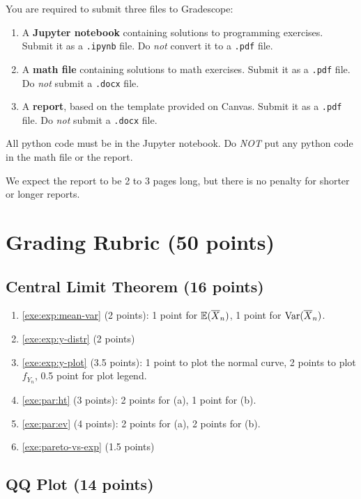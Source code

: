 \documentclass[12pt]{article}
\newcommand*{\Xbar}{\overline{X}}
\begin{document}
You are required to submit three files to Gradescope:
\begin{enumerate}
\item A \textbf{Jupyter notebook} containing solutions to programming exercises.
    Submit it as a \texttt{.ipynb} file. Do \emph{not} convert it to a \texttt{.pdf} file.
\item A \textbf{math file} containing solutions to math exercises.
    Submit it as a \texttt{.pdf} file. Do \emph{not} submit a \texttt{.docx} file.
\item A \textbf{report}, based on the template provided on Canvas.
    Submit it as a \texttt{.pdf} file. Do \emph{not} submit a \texttt{.docx} file.
\end{enumerate}

All python code must be in the Jupyter notebook.
Do \emph{NOT} put any python code in the math file or the report.

We expect the report to be 2 to 3 pages long,
but there is no penalty for shorter or longer reports.

\section{Grading Rubric (50 points)}

\subsection{Central Limit Theorem (16 points)}

\begin{enumerate}
\item \cref{exe:exp:mean-var} (2 points):
    1 point for $\E(\Xbar_n)$,
    1 point for $\Var(\Xbar_n)$.
\item \cref{exe:exp:y-distr} (2 points)
\item \cref{exe:exp:y-plot} (3.5 points):
    1 point to plot the normal curve,
    2 points to plot $f_{Y_n}$,
    0.5 point for plot legend.
\item \cref{exe:par:ht} (3 points):
    2 points for (a),
    1 point for (b).
\item \cref{exe:par:ev} (4 points):
    2 points for (a),
    2 points for (b).
\item \cref{exe:pareto-vs-exp} (1.5 points)
\end{enumerate}

\subsection{QQ Plot (14 points)}
\end{document}
